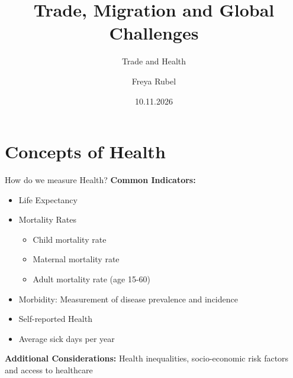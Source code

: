 \documentclass{beamer}
\author{Freya Rubel}
\title{Trade, Migration and Global Challenges}
\subtitle{Trade and Health}
\institute{}
\date{10.11.2026}
\begin{document}
\begin{frame}
    \titlepage
\end{frame}

\begin{frame}
    \tableofcontents[sectionstyle=show, subsectionstyle=show/shaded/hide, subsubsectionstyle=show/shaded/hide]
\end{frame}

\section{Concepts of Health}
\begin{frame}{How do we measure Health?}
    \pause
    \textbf{Common Indicators:}
    \begin{itemize}
        \item Life Expectancy %
        \item Mortality Rates 
        \begin{itemize}
            \item Child mortality rate
            \item Maternal mortality rate
            \item Adult mortality rate (age 15-60) %
        \end{itemize}
        \item Morbidity: Measurement of disease prevalence and incidence %
        \item Self-reported Health %
        \item Average sick days per year %
        \end{itemize}
    \textbf{Additional Considerations:} Health inequalities, socio-economic risk factors and access to healthcare
\end{frame}
\end{document}
